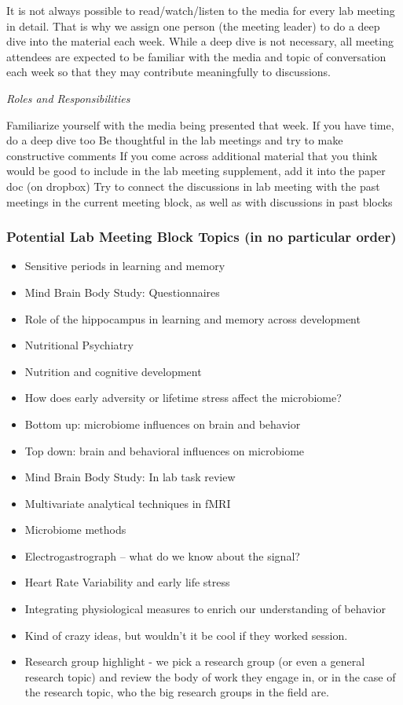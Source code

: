\documentclass[]{book}
\providecommand{\tightlist}{%
  \setlength{\itemsep}{0pt}\setlength{\parskip}{0pt}}
\begin{document}
It is not always possible to read/watch/listen to the media for every lab meeting in detail. That is why we assign one person (the meeting leader) to do a deep dive into the material each week. While a deep dive is not necessary, all meeting attendees are expected to be familiar with the media and topic of conversation each week so that they may contribute meaningfully to discussions.

\emph{Roles and Responsibilities}

Familiarize yourself with the media being presented that week. If you have time, do a deep dive too
Be thoughtful in the lab meetings and try to make constructive comments
If you come across additional material that you think would be good to include in the lab meeting supplement, add it into the paper doc (on dropbox)
Try to connect the discussions in lab meeting with the past meetings in the current meeting block, as well as with discussions in past blocks

\hypertarget{potential-lab-meeting-block-topics-in-no-particular-order}{%
\subsubsection{Potential Lab Meeting Block Topics (in no particular order)}\label{potential-lab-meeting-block-topics-in-no-particular-order}}

\begin{itemize}
\tightlist
\item
  Sensitive periods in learning and memory
\item
  Mind Brain Body Study: Questionnaires
\item
  Role of the hippocampus in learning and memory across development
\item
  Nutritional Psychiatry
\item
  Nutrition and cognitive development
\item
  How does early adversity or lifetime stress affect the microbiome?
\item
  Bottom up: microbiome influences on brain and behavior
\item
  Top down: brain and behavioral influences on microbiome
\item
  Mind Brain Body Study: In lab task review
\item
  Multivariate analytical techniques in fMRI
\item
  Microbiome methods
\item
  Electrogastrograph -- what do we know about the signal?
\item
  Heart Rate Variability and early life stress
\item
  Integrating physiological measures to enrich our understanding of behavior
\item
  Kind of crazy ideas, but wouldn't it be cool if they worked session.
\item
  Research group highlight - we pick a research group (or even a general research topic) and review the body of work they engage in, or in the case of the research topic, who the big research groups in the field are.
\end{itemize}
\end{document}
